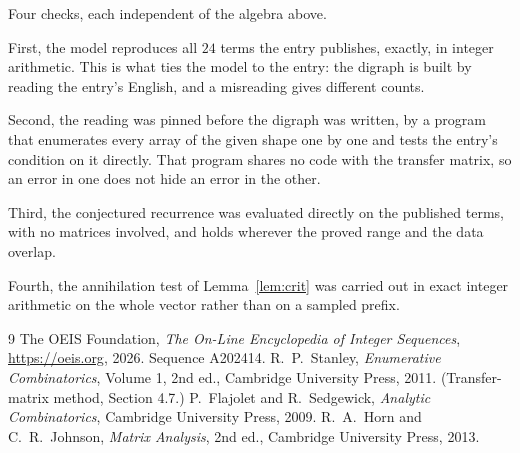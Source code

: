 \documentclass[11pt,a4paper]{article}
\theoremstyle{plain}
\theoremstyle{definition}
\begin{document}
Four checks, each independent of the algebra above.

First, the model reproduces all $24$ terms the entry publishes, exactly, in integer
arithmetic. This is what ties the model to the entry: the digraph is built by reading the
entry's English, and a misreading gives different counts.

Second, the reading was pinned before the digraph was written, by a program that enumerates
every array of the given shape one by one and tests the entry's condition on it directly. That program shares no code with the transfer matrix, so an error in one does not
hide an error in the other.

Third, the conjectured recurrence was evaluated directly on the published terms, with no
matrices involved, and holds wherever the proved range and the data overlap.

Fourth, the annihilation test of Lemma~\ref{lem:crit} was carried out in exact integer
arithmetic on the whole vector rather than on a sampled prefix.

\begin{thebibliography}{9}
 The OEIS Foundation, \emph{The On-Line Encyclopedia of Integer
Sequences}, \url{https://oeis.org}, 2026. Sequence A202414.
 R.~P.~Stanley, \emph{Enumerative Combinatorics}, Volume 1, 2nd ed.,
Cambridge University Press, 2011. (Transfer-matrix method, Section 4.7.)
 P.~Flajolet and R.~Sedgewick, \emph{Analytic Combinatorics}, Cambridge
University Press, 2009.
 R.~A.~Horn and C.~R.~Johnson, \emph{Matrix Analysis}, 2nd ed., Cambridge
University Press, 2013.
\end{thebibliography}
\end{document}
